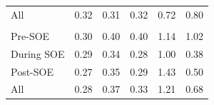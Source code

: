 \begin{table}[!h]
{\begin{tabular}[t]{lrrrrr}
\hspace{1em}All & 0.32 & 0.31 & 0.32 & 0.72 & 0.80\\
\addlinespace[0.3em]
\multicolumn{6}{l}{\textbf{Margin}}\\
\hspace{1em}Pre-SOE & 0.30 & 0.40 & 0.40 & 1.14 & 1.02\\
\hspace{1em}During SOE & 0.29 & 0.34 & 0.28 & 1.00 & 0.38\\
\hspace{1em}Post-SOE & 0.27 & 0.35 & 0.29 & 1.43 & 0.50\\
\hspace{1em}All & 0.28 & 0.37 & 0.33 & 1.21 & 0.68\\
\bottomrule
\end{tabular}}
\end{table}
